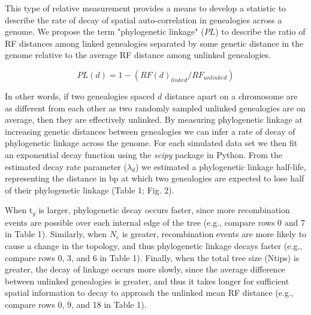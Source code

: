 \documentclass[11pt]{article}
\begin{document}
This type of relative measurement provides a means to develop a statistic to describe the rate of decay of spatial auto-correlation in genealogies across a genome. We propose the term "phylogenetic linkage" ($PL$) to describe the ratio of RF distances among linked genealogies separated by some genetic distance in the genome relative to the average RF distance among unlinked genealogies. 

$$ PL(d) = 1 - (RF(d)_{linked} / RF_{unlinked}) $$

\noindent In other words, if two genealogies spaced $d$ distance apart on a chromosome are as different from each other as two randomly sampled unlinked genealogies are on average, then they are effectively unlinked. By measuring phylogenetic linkage at increasing genetic distances between genealogies we can infer a rate of decay of phylogenetic linkage across the genome. For each simulated data set we then fit an exponential decay function using the \emph{scipy} package in Python. From the estimated decay rate parameter ($\lambda_d$) we estimated a phylogenetic linkage half-life, representing the distance in bp at which two genealogies are expected to lose half of their phylogenetic linkage (Table 1; Fig. 2). 

When t$_g$ is larger, phylogenetic decay occurs faster, since more recombination events are possible over each internal edge of the tree (e.g., compare rows 0 and 7 in Table 1). Similarly, when $N_e$ is greater, recombination events are more likely to cause a change in the topology, and thus phylogenetic linkage decays faster (e.g., compare rows 0, 3, and 6 in Table 1). Finally, when the total tree size (Ntips) is greater, the decay of linkage occurs more slowly, since the average difference between unlinked genealogies is greater, and thus it takes longer for sufficient spatial information to decay to approach the unlinked mean RF distance (e.g., compare rows 0, 9, and 18 in Table 1). 

\end{document}
